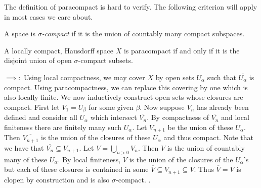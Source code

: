 \documentclass[letterpaper, 11pt, oneside]{book}
\begin{document}
The definition of paracompact is hard to verify.
The following criterion will apply in most cases we care about.
\begin{defn}
  A space is \emph{$\sigma$-compact} if it is the union of countably many compact subspaces.
\end{defn}

\clearpage

\begin{thrm}\label{thrm: paracompact_iff_union_sigma_compact}
  A locally compact, Hausdorff space $X$ is paracompact if and only if it is the disjoint union of open $\sigma$-compact subsets.
\end{thrm}
\begin{pf}
  $\implies\colon$ Using local compactness, we may cover $X$ by open sets $U_{\alpha}$ such that $\overline{U_{\alpha}}$ is compact.
  Using paracompactness, we can replace this covering by one which is also locally finite.
  We now inductively construct open sets whose closures are compact.
  First let $V_{1} = U_{\beta}$ for some given $\beta$.
  Now suppose $V_{n}$ has already been defined and consider all $U_{\alpha}$ which intersect $\overline{V_{n}}$.
  By compactness of $\overline{V_{n}}$ and local finiteness there are finitely many such $U_{\alpha}$.
  Let $V_{n + 1}$ be the union of these $U_{\alpha}$.
  Then $\overline{V_{n + 1}}$ is the union of the closures of these $U_{\alpha}$ and thus compact.
  Note that we have that $\overline{V_{n}} \subseteq V_{n + 1}$.
  Let $V = \bigcup_{n > 0} V_{n}$.
  Then $V$ is the union of countably many of these $U_{\alpha}$.
  By local finiteness, $\overline{V}$ is the union of the closures of the $U_{\alpha}$'s but each of these closures is contained in some $\overline{V} \subseteq V_{n + 1} \subseteq V$.
  Thus $\overline{V} = V$ is clopen by construction and is also $\sigma$-compact.
  .


\end{pf}
\end{document}
